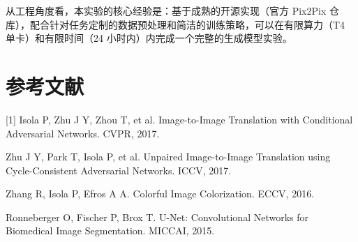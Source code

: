\documentclass[UTF8,a4paper,twocolumn]{ctexart}
\begin{document}
从工程角度看，本实验的核心经验是：基于成熟的开源实现（官方 Pix2Pix 仓库），配合针对任务定制的数据预处理和简洁的训练策略，可以在有限算力（T4 单卡）和有限时间（24 小时内）内完成一个完整的生成模型实验。

\section{参考文献}
[1] Isola P, Zhu J Y, Zhou T, et al. Image-to-Image Translation with Conditional Adversarial Networks. CVPR, 2017.\par
[2] Zhu J Y, Park T, Isola P, et al. Unpaired Image-to-Image Translation using Cycle-Consistent Adversarial Networks. ICCV, 2017.\par
[3] Zhang R, Isola P, Efros A A. Colorful Image Colorization. ECCV, 2016.\par
[4] Ronneberger O, Fischer P, Brox T. U-Net: Convolutional Networks for Biomedical Image Segmentation. MICCAI, 2015.
\end{document}
